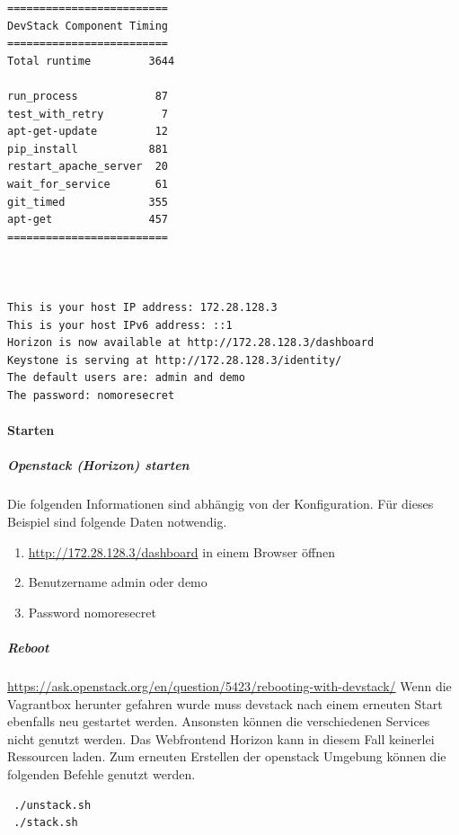 \documentclass[a4paper,10pt]{article}
\begin{document}
\begin{minipage}{\textwidth}
\begin{lstlisting}[frame=single,caption=Ausgabe von DevStack]
=========================
DevStack Component Timing
=========================
Total runtime         3644

run_process            87
test_with_retry         7
apt-get-update         12
pip_install           881
restart_apache_server  20
wait_for_service       61
git_timed             355
apt-get               457
=========================



This is your host IP address: 172.28.128.3
This is your host IPv6 address: ::1
Horizon is now available at http://172.28.128.3/dashboard
Keystone is serving at http://172.28.128.3/identity/
The default users are: admin and demo
The password: nomoresecret
\end{lstlisting}
\end{minipage}

\paragraph{Starten}

\subparagraph{Openstack (Horizon) starten}

Die folgenden Informationen sind abhängig von der Konfiguration.
Für dieses Beispiel sind folgende Daten notwendig.

\begin{enumerate}
 \item \url{http://172.28.128.3/dashboard} in einem Browser öffnen
 \item Benutzername admin oder demo
 \item Password nomoresecret
\end{enumerate}

\subparagraph{Reboot}

\url{https://ask.openstack.org/en/question/5423/rebooting-with-devstack/}
Wenn die Vagrantbox herunter gefahren wurde muss devstack nach einem erneuten Start ebenfalls neu gestartet werden.
Ansonsten können die verschiedenen Services nicht genutzt werden.
Das Webfrontend Horizon kann in diesem Fall keinerlei Ressourcen laden.
Zum erneuten Erstellen der openstack Umgebung können die folgenden Befehle genutzt werden.

\begin{verbatim}
 ./unstack.sh
 ./stack.sh
\end{verbatim}
\end{document}
